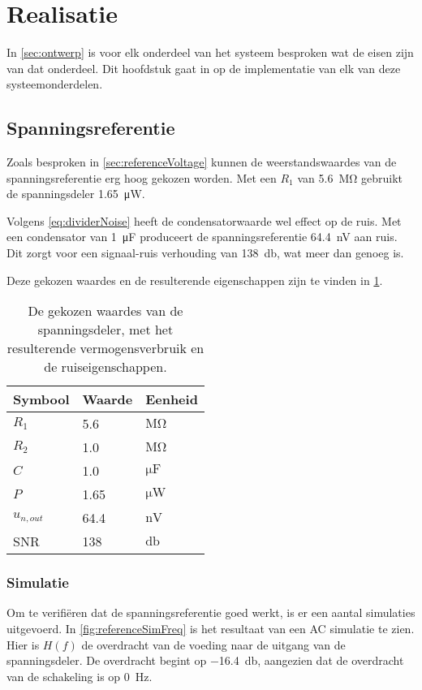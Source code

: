 \section{Realisatie}
In \cref{sec:ontwerp} is voor elk onderdeel van het systeem besproken wat de eisen zijn van dat onderdeel. Dit hoofdstuk gaat in op de implementatie van elk van deze systeemonderdelen.

\subsection{Spanningsreferentie}
Zoals besproken in \cref{sec:referenceVoltage} kunnen de weerstandswaardes van de spanningsreferentie erg hoog gekozen worden. Met een $R_1$ van \qty{5.6}{\mega\ohm} gebruikt de spanningsdeler \qty{1.65}{\micro\watt}.

Volgens \cref{eq:dividerNoise} heeft de condensatorwaarde wel effect op de ruis. Met een condensator van \qty{1}{\micro\farad} produceert de spanningsreferentie \qty{64.4}{\nano\volt} aan ruis. Dit zorgt voor een signaal-ruis verhouding van \qty{138}{\decibel}, wat meer dan genoeg is.

Deze gekozen waardes en de resulterende eigenschappen zijn te vinden in \cref{tab:divider}.

\begin{table}[!htbp]
    \centering
    \begin{tabular}{l|l|l}
        Symbool & Waarde & Eenheid \\
        \hline
        $R_1$       & 5.6  & $\si{\mega\ohm}$   \\
        $R_2$       & 1.0  & $\si{\mega\ohm}$   \\
        $C$         & 1.0  & $\si{\micro\farad}$\\
        $P$         & 1.65 & $\si{\micro\watt}$ \\
        $u_{n,out}$ & 64.4 & $\si{\nano\volt}$  \\
        SNR         & 138  & $\si{\decibel}$
    \end{tabular}
    \caption{De gekozen waardes van de spanningsdeler, met het resulterende vermogensverbruik en de ruiseigenschappen.}
    \label{tab:divider}
\end{table}

\subsubsection{Simulatie}
Om te verifiëren dat de spanningsreferentie goed werkt, is er een aantal simulaties uitgevoerd.
In \cref{fig:referenceSimFreq} is het resultaat van een AC simulatie te zien. Hier is $H(f)$ de overdracht van de voeding naar de uitgang van de spanningsdeler. De overdracht begint op \qty{-16.4}{\decibel}, aangezien dat de overdracht van de schakeling is op \qty{0}{\hertz}.

